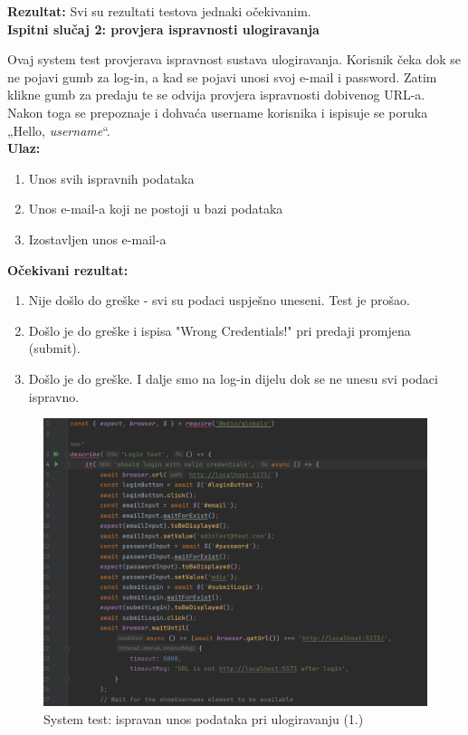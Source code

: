 			\textbf{Rezultat:}
			Svi su rezultati testova jednaki očekivanim.\\
			
			\textbf{Ispitni slučaj 2: provjera ispravnosti ulogiravanja}
			
			Ovaj system test provjerava ispravnost sustava ulogiravanja. Korisnik čeka dok se ne pojavi gumb za log-in, a kad se pojavi unosi svoj e-mail i password. Zatim klikne gumb za predaju te se odvija provjera ispravnosti dobivenog URL-a. Nakon toga se prepoznaje i dohvaća username korisnika i ispisuje se poruka „Hello, \textit{username}“. \\
			
			\textbf{Ulaz:}
			
				\begin{enumerate}
					\item Unos svih ispravnih podataka
					\item Unos e-mail-a koji ne postoji u bazi podataka
					\item Izostavljen unos e-mail-a
				\end{enumerate}
				
			\textbf{Očekivani rezultat:}
			
				\begin{enumerate}
					\item Nije došlo do greške - svi su podaci uspješno uneseni. Test je prošao.
					\item Došlo je do greške i ispisa "Wrong Credentials!" pri predaji promjena (submit).
					\item Došlo je do greške. I dalje smo na log-in dijelu dok se ne unesu svi podaci ispravno.
				\end{enumerate}
			
			\begin{figure}[H]
				\includegraphics[scale=0.7]{slike/syslogin1.PNG} 
				\centering
				\caption{System test: ispravan unos podataka pri ulogiravanju (1.)}
				\label{syslogin1}
			\end{figure}
			
